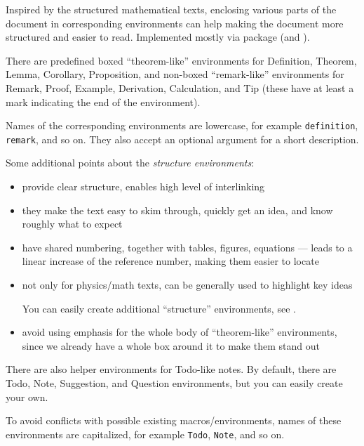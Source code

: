 Inspired by the structured mathematical texts, enclosing various parts of the document in corresponding environments can help making the document more structured and easier to read.
Implemented mostly via  package (and ).

\begin{remark}
    There are predefined boxed \enquote{theorem-like} environments for \textsf{Definition}, \textsf{Theorem}, \textsf{Lemma}, \textsf{Corollary}, \textsf{Proposition},
    and non-boxed \enquote{remark-like} environments for \textsf{Remark}, \textsf{Proof}, \textsf{Example}, \textsf{Derivation}, \textsf{Calculation}, and \textsf{Tip} (these have at least a mark indicating the end of the environment).

    Names of the corresponding environments are lowercase, for example \texttt{definition}, \texttt{remark}, and so on.
    They also accept an optional argument for a short description.
\end{remark}

Some additional points about the \emph{structure environments}:
\begin{itemize}
    \item provide clear structure, enables high level of interlinking
    \item they make the text easy to skim through, quickly get an idea, and know roughly what to expect
    \item have shared numbering, together with tables, figures, equations --- leads to a linear increase of the reference number, making them easier to locate
    \item not only for physics/math texts, can be generally used to highlight key ideas
          \begin{tip}
              You can easily create additional \enquote{structure} environments, see .
          \end{tip}
    \item avoid using emphasis for the whole body of \enquote{theorem-like} environments, since we already have a whole box around it to make them stand out
\end{itemize}
\vspace{1ex}

\begin{remark}
    There are also helper environments for \textsf{Todo}-like notes.
    By default, there are \textsf{Todo}, \textsf{Note}, \textsf{Suggestion}, and \textsf{Question} environments, but you can easily create your own.

    To avoid conflicts with possible existing macros/environments, names of these environments are capitalized, for example \texttt{Todo}, \texttt{Note}, and so on.
\end{remark}

